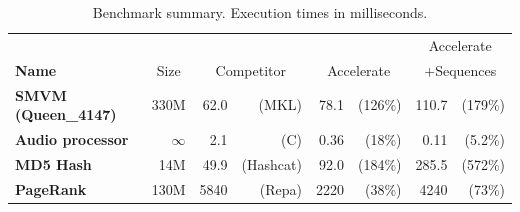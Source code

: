 


\begin{table}
\begin{center}
\begin{tabular}{lrrrrrrr}

                        &
                        &
                        &
                        &
                        &
                        & \multicolumn{2}{c}{Accelerate}
                        \\

  \textbf{Name}         & \multicolumn{1}{c}{Size}
                        & \multicolumn{2}{c}{Competitor}
                        & \multicolumn{2}{c}{Accelerate}
                        & \multicolumn{2}{c}{+Sequences}
                        \\

  \midrule

  \textbf{SMVM (Queen\_4147)}
                        & 330M
                        & 62.0
                        & (MKL)
                        & 78.1
                        & (126\%)
                        & 110.7
                        & (179\%)
                        \\

  \textbf{Audio processor}
                        & $\infty$
                        & 2.1
                        & (C)
                        & 0.36
                        & (18\%)
                        & 0.11
                        & (5.2\%)
                        \\

  \textbf{MD5 Hash}     & 14M
                        & 49.9
                        & (Hashcat)
                        & 92.0
                        & (184\%)
                        & 285.5
                        & (572\%)
                        \\

  \textbf{PageRank}     & 130M
                        & 5840
                        & (Repa)
                        & 2220
                        & (38\%)
                        & 4240
                        & (73\%)
                        \\

  \bottomrule
\end{tabular}
\end{center}
\caption{Benchmark summary. Execution times in milliseconds.}
\label{tab:benchmarks}
\end{table}


